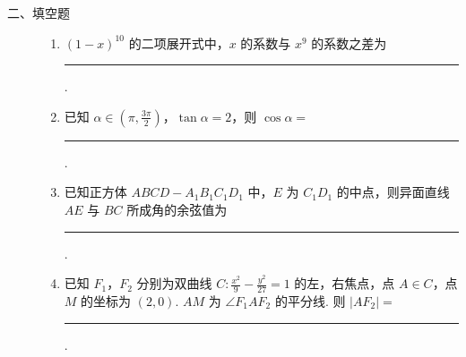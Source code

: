 \begin{description}

    \item[二、填空题]

    \begin{enumerate}[leftmargin=5pt]

      \addtocounter{enumi}{+12}

        \item \((1-x)^{10}\) 的二项展开式中，\(x\) 的系数与 \(x^9\) 的系数之差为\rule[-0.3ex]{3em}{0.4pt}.

        \item 已知 \(\alpha\in\left(\pi,\frac{3\pi}{2}\right)\)，\(\tan\alpha=2\)，则 \(\cos\alpha=\)\rule[-0.3ex]{3em}{0.4pt}.

        \item 已知正方体 \(ABCD-A_1B_1C_1D_1\) 中，\(E\) 为 \(C_1D_1\) 的中点，则异面直线 \(AE\) 与 \(BC\) 所成角的余弦值为\rule[-0.3ex]{3em}{0.4pt}.

        \item 已知 \(F_1\)，\(F_2\) 分别为双曲线 \(C:\frac{x^2}{9}-\frac{y^2}{27}=1\) 的左，右焦点，点 \(A\in C\)，点 \(M\) 的坐标为 \((2,0)\). \(AM\) 为 \(\angle F_1AF_2\) 的平分线. 则 \(|AF_2|=\)\rule[-0.3ex]{3em}{0.4pt}.

    \end{enumerate}

\end{description}

